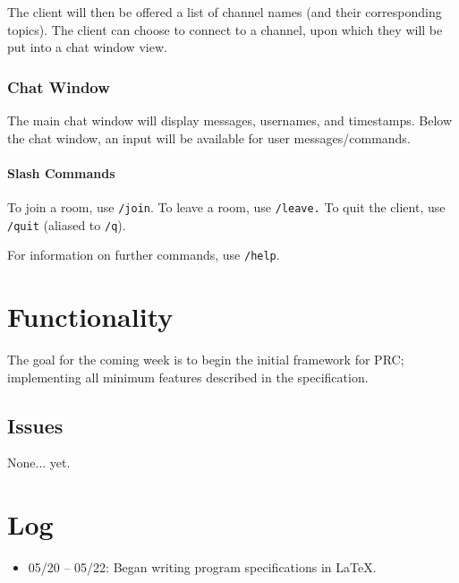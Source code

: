 \documentclass{article}
\begin{document}
The client will then be offered a list of channel names (and their corresponding topics). The client can choose to connect to a channel, upon which they will be put into a chat window view.


\subsubsection{Chat Window}
The main chat window will display messages, usernames, and timestamps. Below the chat window, an input will be available for user messages/commands.

\paragraph{Slash Commands}
To join a room, use \verb|/join|. To leave a room, use \verb|/leave.| To quit the client, use \verb|/quit| (aliased to \verb|/q|).

For information on further commands, use \verb|/help|.

\section{Functionality}
The goal for the coming week is to begin the initial framework for PRC; implementing all minimum features described in the specification.

\subsection{Issues}
None... yet.

\section{Log}
\begin{itemize}
    \item 05/20 -- 05/22: Began writing program specifications in \LaTeX.
\end{itemize}
\end{document}

